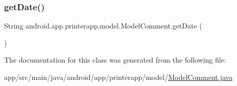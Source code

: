 \mbox{\label{classandroid_1_1app_1_1printerapp_1_1model_1_1_model_comment_a165d8a25e2879be1b15782c64f716447}} 
\subsubsection{\texorpdfstring{get\+Date()}{getDate()}}
{\footnotesize\ttfamily String android.\+app.\+printerapp.\+model.\+Model\+Comment.\+get\+Date (\begin{DoxyParamCaption}{ }\end{DoxyParamCaption})}



The documentation for this class was generated from the following file\+:\begin{DoxyCompactItemize}
\item 
app/src/main/java/android/app/printerapp/model/\hyperlink{_model_comment_8java}{Model\+Comment.\+java}\end{DoxyCompactItemize}
